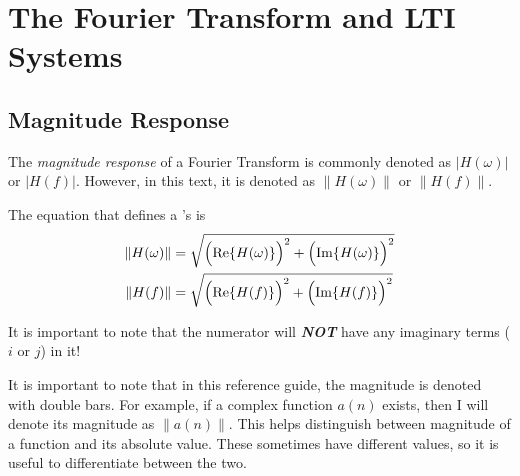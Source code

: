 \section{The Fourier Transform and LTI Systems}\label{sec:Fourier_Transform-LTI_Systems}
\subsection{Magnitude Response}\label{subsec:Fourier_Magnitude_Response}
\begin{definition}\label{def:Fourier_Magnitude_Response}
  The \emph{magnitude response} of a Fourier Transform is commonly denoted as $\lvert H(\omega) \rvert$ or $\lvert H(f) \rvert$.
  However, in this text, it is denoted as $\lVert H(\omega) \rVert$ or $\lVert H(f) \rVert$.

  The equation that defines a 's  is
  \begin{equation}\label{eq:Fourier_Magnitude_Response}
    \begin{aligned}
      \lVert H(\omega) \rVert &= \sqrt{{\Bigl( \Re \lbrace H(\omega) \rbrace \Bigr)}^{2} + {\Bigl( \Im \lbrace H(\omega) \rbrace \Bigr)}^{2}} \\
      \lVert H(f) \rVert &= \sqrt{{\Bigl( \Re \lbrace H(f) \rbrace \Bigr)}^{2} + {\Bigl( \Im \lbrace H(f) \rbrace \Bigr)}^{2}} \\
    \end{aligned}
  \end{equation}

  \begin{remark}
    It is important to note that the numerator will \textbf{\emph{NOT}} have any imaginary terms ($i$ or $j$) in it!
  \end{remark}
\end{definition}

\begin{remark*}
  It is important to note that in this reference guide, the magnitude is denoted with double bars.
  For example, if a complex function $a(n)$ exists, then I will denote its magnitude as $\lVert a(n) \rVert$.
  This helps distinguish between magnitude of a function and its absolute value.
  These sometimes have different values, so it is useful to differentiate between the two.
\end{remark*}

